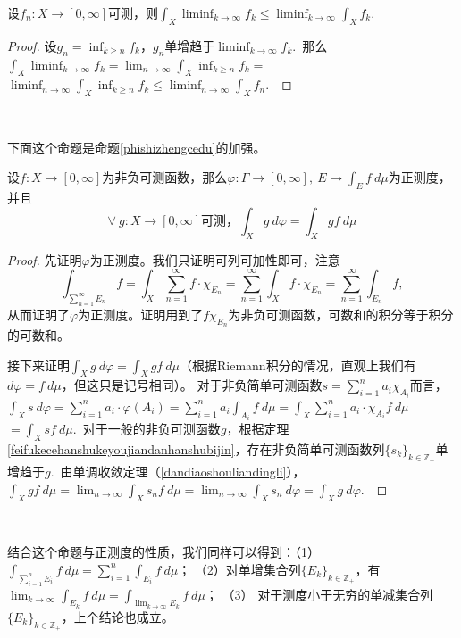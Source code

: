 \documentclass[color=green,thmcnt=section,lang=cn,12pt]{elegantbook}
\numberwithin{equation}{section}%
\numberwithin{figure}{section}%
\newcommand{\ZZ}{\mathbb{Z}}
\newcommand{\any}{\forall \ }
\newcommand{\csf}[1]{\{#1_k\}_{k\in \ZZ_+}} %
\newcommand{\cs}[1]{\sum_{#1=1}^{\infty}} %
\newcommand{\linf}[1]{\liminf_{k\rightarrow \infty}#1_k} %
\newcommand{\jd}[1]{#1=\sum_{i=1}^{n}a_i\chi_{A_i}} %
\newcommand{\ff}[1]{#1:X\to [0,\infty]} %
\begin{document}
\begin{lemma}[Fatou]\label{fatouyinli}
    设$\ff{f_n}$可测，则$\int_{X}\linf{f}\leq \liminf_{k\to \infty}\int_Xf_k$.\ 
\end{lemma}
\begin{proof}
    设$g_n=\inf_{k\geq n}f_k$，$g_n$单增趋于$\linf{f}$.\ 那么$\int_{X}\linf{f}=\lim_{n\to \infty}\int_{X}\inf_{k\geq n}f_k=$
    $\liminf_{n\to \infty}\int_{X}\inf_{k\geq n}f_k\leq \liminf_{n\to \infty}\int_{X}f_n$.\ 
\end{proof}
\ 


下面这个命题是命题\ref{phishizhengcedu}的加强。
\begin{proposition}\label{phishizhengcedu2}
    设$\ff{f}$为非负可测函数，那么$\varphi:\Gamma\to [0,\infty],\ E\mapsto \int_{E}f\ d\mu$为正测度，并且
    \begin{equation*}
        \any \ff{g} \mbox{可测，}\int_{X}g\ d\varphi=\int_Xgf\ d\mu
    \end{equation*}
\end{proposition}
\begin{proof}
    先证明$\varphi$为正测度。我们只证明可列可加性即可，注意\begin{equation*}
        \int_{\sum_{n=1}^{\infty}E_n}f=\int_X\cs{n}f\cdot \chi_{E_n}=\cs{n}\int_{X}f\cdot \chi_{E_n}=\cs{n}\int_{E_n}f,
    \end{equation*}
    从而证明了$\varphi$为正测度。证明用到了$f\chi_{E_n}$为非负可测函数，可数和的积分等于积分的可数和。


    接下来证明$\int_{X}g\ d\varphi=\int_Xgf\ d\mu$（根据Riemann积分的情况，直观上我们有$d\varphi=f\ d\mu$，但这只是记号相同）。
    对于非负简单可测函数$\jd{s}$而言，$\int_{X}s \ d\varphi=\sum_{i=1}^{n}a_i\cdot \varphi(A_i)=\sum_{i=1}^{n}a_i\int_{A_i}f\ d\mu=\int_{X}\sum_{i=1}^{n}a_i\cdot\chi_{A_i} f\ d\mu$
    $=\int_Xsf\ d\mu$.\ 对于一般的非负可测函数$g$，根据定理\ref{feifukecehanshukeyoujiandanhanshubijin}，存在非负简单可测函数列$\csf{s}$单增趋于$g$.\ 
    由单调收敛定理（\ref{dandiaoshouliandingli}），$\int_Xgf\ d\mu=\lim_{n\to \infty}\int_Xs_nf\ d\mu=\lim_{n\to \infty}\int_Xs_n\ d\varphi=\int_Xg\ d\varphi$.\ 
\end{proof}
\ 


结合这个命题与正测度的性质，我们同样可以得到：（1） $\int_{\sum_{i=1}^{n}E_i}f\ d\mu=\sum_{i=1}^{n}\int_{E_i}f\ d\mu$；
（2）对单增集合列$\csf{E}$，有$\lim_{k\to \infty}\int_{E_k}f\ d\mu=\int_{\lim_{k\to \infty}E_k}f \ d\mu$；
（3） 对于测度小于无穷的单减集合列$\csf{E}$，上个结论也成立。
\end{document}
